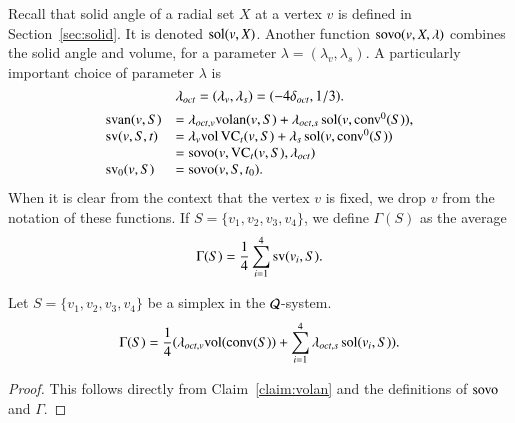 \begin{definition}\label{def:svor}
Recall that solid angle of a radial set $X$ at a vertex $v$ is defined in
Section~\ref{sec:solid}.  It is denoted $\operatorname{sol}(v,X)$.
Another function ${\operatorname{sovo}}(v,X,\lambda)$ combines the solid
angle and volume, for a parameter $\lambda=(\lambda_v,\lambda_s)$.
A particularly important choice of parameter $\lambda$ is
$$
 \lambda_{oct}=(\lambda_v,\lambda_s)=(-4\delta_{oct},1/3).
$$
%
      $$
      \begin{array}{lll}
      {\operatorname{svan}}(v,S) &= \lambda_{oct,v} {\operatorname{volan}}(v,S)
         +\lambda_{oct,s}\operatorname{sol}(v,{\operatorname{conv}}^0(S)),\\
      {\operatorname{sv}}(v,S,t) &= \lambda_v {\operatorname{vol}}\,{\operatorname{VC}}_{t}(v,S)
         +\lambda_s\operatorname{sol}(v,{\operatorname{conv}}^0(S))\\
          &= {\operatorname{sovo}}(v,{\operatorname{VC}}_t(v,S),\lambda_{oct})\\
            {\operatorname{sv}}_0(v,S) &= {\operatorname{sovo}}(v,S,t_0).
      \end{array}$$
When it is clear from the context that the vertex $v$ is
fixed, we drop $v$ from the notation of these
functions.
   If $S=\{v_1,v_2,v_3,v_4\}$, we define $\Gamma(S)$ as the average
   \begin{equation}
   \Gamma(S) = \frac{1}{4}\sum_{i=1}^4{\operatorname{sv}}(v_i,S).
   \label{eqn:gamma}
   \end{equation}
%
\end{definition}

\begin{lemma}\label{lemma:gammavol}
Let $S=\{v_1,v_2,v_3,v_4\}$ be a simplex in the ${\mathcal Q}$-system.
    $$\Gamma(S) = \frac{1}{4}(\lambda_{oct,v}{\operatorname{vol}}({\operatorname{conv}}(S)) +\sum_{i=1}^4
    \lambda_{oct,s}\operatorname{sol}(v_i,S)).
    $$
\end{lemma}

\begin{proof} This follows directly from Claim~\ref{claim:volan}
and the definitions of ${\operatorname{sovo}}$ and $\Gamma$.
\end{proof}

